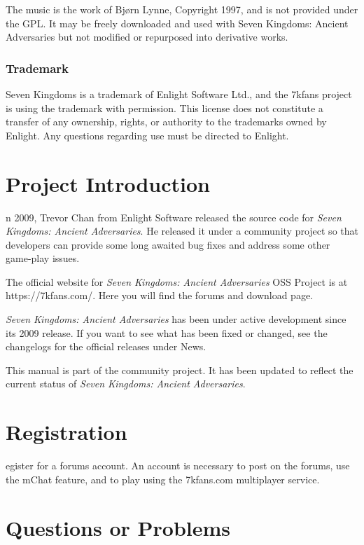 \documentclass[openany]{book}
\begin{document}
The music is the work of Bjørn Lynne, Copyright 1997, and is not provided under the GPL. It may be freely downloaded and used with Seven Kingdoms: Ancient Adversaries but not modified or repurposed into derivative works.

\subsubsection{\textsf{Trademark}}

Seven Kingdoms is a trademark of Enlight Software Ltd., and the 7kfans project is using the trademark with permission. This license does not constitute a transfer of any ownership, rights, or authority to the trademarks owned by Enlight. Any questions regarding use must be directed to Enlight.

\clearpage

\section{\textsf{Project Introduction}}

n 2009, Trevor Chan from Enlight Software released the source code for \textit{Seven Kingdoms: Ancient Adversaries}. He released it under a community project so that developers can provide some long awaited bug fixes and address some other game-play issues.

The official website for \textit{Seven Kingdoms: Ancient Adversaries} OSS Project is at https://7kfans.com/. Here you will find the forums and download page.

\textit{Seven Kingdoms: Ancient Adversaries} has been under active development since its 2009 release. If you want to see what has been fixed or changed, see the changelogs for the official releases under News.

This manual is part of the community project. It has been updated to reflect the current status of \textit{Seven Kingdoms: Ancient Adversaries}.

\section{\textsf{Registration}}


egister for a forums account. An account is necessary to post on the forums, use the mChat feature, and to play using the 7kfans.com multiplayer service.

\section{\textsf{Questions or Problems}}
\end{document}
